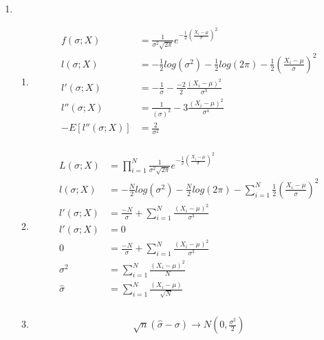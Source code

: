 \documentclass{article}
\begin{document}

\begin{enumerate}
\item
	\begin{enumerate}
	\item
		\begin{equation*}
		\begin{split}
		f(\sigma;X) & = \frac{1}{\sigma^{2} \sqrt{2 \pi}} e^{-\frac{1}{2}(\frac{X_{i}-\mu}{\sigma})^{2}} \\
		l(\sigma;X) & = -\frac{1}{2} log{(\sigma^{2})} - \frac{1}{2} log(2 \pi) - \frac{1}{2}(\frac{X_{i}-\mu}{\sigma})^{2} \\
		l'(\sigma;X) &  =  -\frac{1}{\sigma} - \frac{-2}{2}\frac{(X_{i}-\mu)^{2}}{\sigma^{3}} \\
		l''(\sigma;X) & = \frac{1}{(\sigma)^{2}} - 3\frac{(X_{i}-\mu)^{2}}{\sigma^{4}} \\
		-E[l''(\sigma;X)] & = \frac{2}{\sigma^{2}} \\
		\end{split}
		\end{equation*}
	\item
		\begin{equation*}
		\begin{split}
		L(\sigma;X) & = \prod_{i=1}^{N} \frac{1}{\sigma^{2} \sqrt{2 \pi}} e^{-\frac{1}{2}(\frac{X_{i}-\mu}{\sigma})^{2}} \\
		l(\sigma;X) & = -\frac{N}{2} log{(\sigma^{2})} - \frac{N}{2} log(2 \pi) - \sum_{i=1}^{N}  \frac{1}{2}(\frac{X_{i}-\mu}{\sigma})^{2} \\
		l'(\sigma;X) &  =  \frac{-N}{\sigma}+ \sum_{i=1}^{N}  \frac{(X_{i}-\mu)^{2}}{\sigma^{3}} \\
		l'(\sigma;X) &  = 0 \\
		0 & = \frac{-N}{\sigma}+ \sum_{i=1}^{N}  \frac{(X_{i}-\mu)^{2}}{\sigma^{3}} \\
		\sigma^{2} & = \sum_{i=1}^{N}  \frac{(X_{i}-\mu)^{2}}{N} \\
		\hat{\sigma} & = \sum_{i=1}^{N}  \frac{(X_{i}-\mu)}{\sqrt{N}} \\
		\end{split}
		\end{equation*}
	\item
		\begin{equation*}
		\begin{split}
		\sqrt {n} (\hat{\sigma} - \sigma) \rightarrow N(0, \frac{\sigma^{2}}{2}) 
		\end{split}

\end{equation*}
\end{enumerate}
\end{enumerate}
\end{document}
